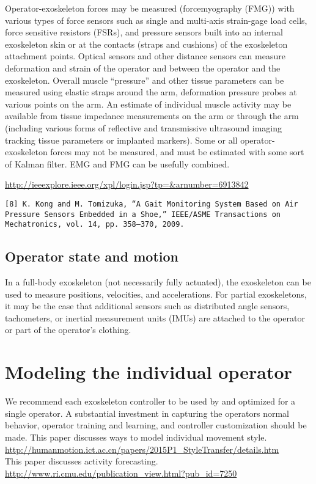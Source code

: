 \documentclass[letterpaper,12pt,fullpage]{article}
\begin{document}
Operator-exoskeleton forces may be measured (forcemyography (FMG))
with various types of
force sensors such as single and multi-axis strain-gage load cells,
force sensitive resistors (FSRs), and pressure sensors built into an internal exoskeleton skin or at the
contacts (straps and cushions) of the exoskeleton attachment points.
Optical sensors and other distance sensors can measure deformation and
strain of the operator and between the operator and the exoskeleton.
Overall muscle ``pressure'' and other tissue parameters can be measured using
elastic straps around the arm, deformation pressure probes at various
points on the arm.
An estimate of individual muscle activity
may be available from tissue impedance measurements on the arm
or through the arm (including various forms of reflective and transmissive
ultrasound imaging tracking tissue parameters or implanted markers).
Some or all operator-exoskeleton forces may not be measured, and must
be estimated with some sort of Kalman filter.
EMG and FMG can be usefully combined.

\url{http://ieeexplore.ieee.org/xpl/login.jsp?tp=&arnumber=6913842}\\

\begin{verbatim}
[8] K. Kong and M. Tomizuka, “A Gait Monitoring System Based on Air
Pressure Sensors Embedded in a Shoe,” IEEE/ASME Transactions on
Mechatronics, vol. 14, pp. 358–370, 2009.
\end{verbatim}

\subsection{Operator state and motion}

In a full-body exoskeleton
(not necessarily fully actuated), the
exoskeleton can be used to measure positions, velocities,
and accelerations. For partial exoskeletons,
it may be the case that additional sensors such as distributed 
angle sensors, tachometers, or inertial measurement units (IMUs)
are attached to the operator or part of the operator's clothing.

\section{Modeling the individual operator}

We recommend each exoskeleton controller
to be used by and optimized for a single operator.
A substantial investment in capturing the operators normal behavior,
operator training and learning, and controller customization should be made.
This paper discusses ways to model individual movement style.\\
\url{http://humanmotion.ict.ac.cn/papers/2015P1_StyleTransfer/details.htm}\\
This paper discusses activity forecasting.\\
\url{http://www.ri.cmu.edu/publication_view.html?pub_id=7250}
\end{document}
